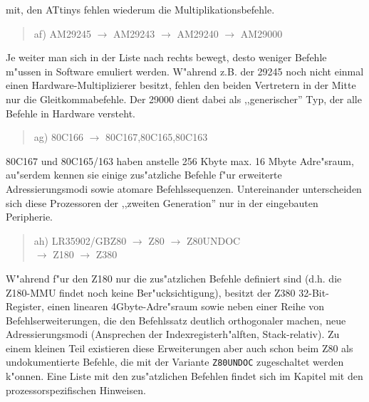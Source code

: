 \documentclass[12pt,a4paper,twoside]{report}
\newcommand{\tty}[1]{{\tt #1}}
\begin{document}
mit, den ATtinys fehlen wiederum die Multiplikationsbefehle.
\begin{quote}
af) AM29245 $\rightarrow$ AM29243 $\rightarrow$ AM29240 $\rightarrow$ AM29000
\end{quote}
Je weiter man sich in der Liste nach rechts bewegt, desto weniger
Befehle m"ussen in Software emuliert werden.  W"ahrend z.B. der 29245
noch nicht einmal einen Hardware-Multiplizierer besitzt, fehlen den
beiden Vertretern in der Mitte nur die Gleitkommabefehle.  Der 29000
dient dabei als ,,generischer'' Typ, der alle Befehle in Hardware versteht.
\begin{quote}
ag) 80C166 $\longrightarrow$ 80C167,80C165,80C163
\end{quote}
80C167 und 80C165/163 haben anstelle 256 Kbyte max. 16 Mbyte Adre"sraum,
au"serdem kennen sie einige zus"atzliche Befehle f"ur erweiterte
Adressierungsmodi sowie atomare Befehlssequenzen.  Untereinander
unterscheiden sich diese Prozessoren der ,,zweiten Generation'' nur in der
eingebauten Peripherie.
\begin{quote}
ah) LR35902/GBZ80 $\rightarrow$ Z80 $\rightarrow$ Z80UNDOC \\
    $\rightarrow$ Z180 $\rightarrow$ Z380
\end{quote}
W"ahrend f"ur den Z180 nur die zus"atzlichen Befehle definiert sind
(d.h. die Z180-MMU findet noch keine Ber"ucksichtigung), besitzt der
Z380 32-Bit-Register, einen linearen 4Gbyte-Adre"sraum sowie neben
einer Reihe von Befehlserweiterungen, die den Befehlssatz deutlich
orthogonaler machen, neue Adressierungsmodi (Ansprechen der
Indexregisterh"alften, Stack-relativ).  Zu einem kleinen Teil existieren
diese Erweiterungen aber auch schon beim Z80 als undokumentierte
Befehle, die mit der Variante \tty{Z80UNDOC} zugeschaltet werden
k"onnen.  Eine Liste mit den zus"atzlichen Befehlen findet sich im
Kapitel mit den prozessorspezifischen Hinweisen.
\end{document}
